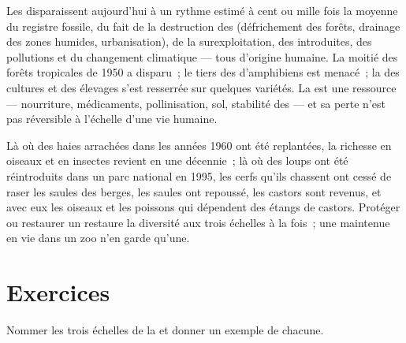\begin{proposition}\label{prop:g10:biodiversity-scales:present}
Les  disparaissent aujourd'hui à un rythme estimé à cent ou
mille fois la moyenne du registre fossile, du fait de la destruction
des  (défrichement des forêts, drainage des zones humides,
urbanisation), de la surexploitation, des  introduites, des
pollutions et du changement climatique --- tous d'origine humaine. La
moitié des forêts tropicales de 1950 a disparu~; le tiers des 
d'amphibiens est menacé~; la  des cultures et des
élevages s'est resserrée sur quelques variétés. La  est
une ressource --- nourriture, médicaments, pollinisation, sol,
stabilité des  --- et sa perte n'est pas réversible à
l'échelle d'une vie humaine.
\end{proposition}
\admitted

\begin{example}\label{ex:g10:biodiversity-scales:reversing}
Là où des haies arrachées dans les années 1960 ont été replantées, la
richesse en oiseaux et en insectes revient en une décennie~; là où des
loups ont été réintroduits dans un parc national en 1995, les cerfs
qu'ils chassent ont cessé de raser les saules des berges, les saules
ont repoussé, les castors sont revenus, et avec eux les oiseaux et les
poissons qui dépendent des étangs de castors. Protéger ou restaurer un
 restaure la diversité aux trois échelles à la fois~; une
 maintenue en vie dans un zoo n'en garde qu'une.
\end{example}

\section{Exercices}

\begin{exercise}[$\star$]\label{exo:g10:biodiversity-scales:1}
Nommer les trois échelles de la  et donner un exemple de
chacune.
\end{exercise}

